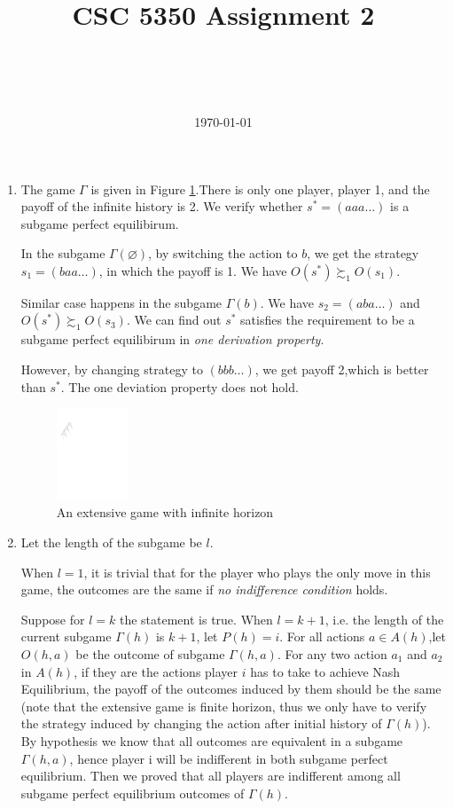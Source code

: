 \documentclass[a4paper,12pt]{article}
\title{CSC 5350 Assignment 2}
\author{\myname\\\mymail\\\CSE\\\CUHK}
\date{\today}
\begin{document}
\maketitle
\begin{enumerate}
\item
The game $\Gamma$ is given in Figure \ref{fig:deviate}.There is only one player, player 1, 
and the payoff of the infinite history is 2.
We verify whether $s^*=(aaa\ldots)$ is a subgame perfect equilibirum.

In the subgame $\Gamma(\varnothing)$, by switching the action to $b$, 
we get the strategy $s_1=(baa\ldots)$, in which the payoff is 1. 
We have $O(s^*) \succsim_1 O(s_1)$.

Similar case happens in the subgame $\Gamma(b)$. We have $s_2=(aba\ldots)$ and $O(s^*) \succsim_1 O(s_3)$.
We can find out $s^*$ satisfies the requirement to be a subgame perfect equilibirum in \textit{one derivation property}.

However, by changing strategy to $(bbb\ldots)$, we get payoff 2,which is better than $s^*$.
The one deviation property does not hold.

\begin{figure}[!ht]
\centering
	\includegraphics[width=0.2\textwidth]{deviate.pdf}
	\caption{An extensive game with infinite horizon}
	\label{fig:deviate}
\end{figure}

\item
Let the length of the subgame be $l$. 

When $l=1$, it is trivial that for the player who plays the only move in this game, 
the outcomes are the same if \textit{no indifference condition} holds. 

Suppose for $l=k$ the statement is true.
When $l=k+1$, i.e. the length of the current subgame $\Gamma(h)$ is $k+1$,
let $P(h)=i$. For all actions $a \in A(h)$,let $O(h,a)$ be the outcome of subgame $\Gamma(h,a)$. 
For any two action $a_1$ and $a_2$ in $A(h)$, 
if they are the actions player $i$ has to take to achieve Nash Equilibrium,
the payoff of the outcomes induced by them should be the same
(note that the extensive game is finite horizon,
thus we only have to verify the strategy induced by changing the action after initial history of $\Gamma(h)$).
By hypothesis we know that all outcomes are equivalent in a subgame $\Gamma(h,a)$,
hence player i will be indifferent in both subgame perfect equilibrium.
Then we proved that all players are indifferent among all subgame perfect equilibrium outcomes of $\Gamma(h)$.



\end{enumerate}
\end{document}
